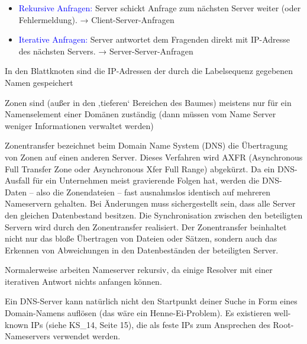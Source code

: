 \begin{itemize}
    \item \textcolor{blue}{Rekursive Anfragen:} Server schickt Anfrage zum nächsten Server weiter (oder Fehlermeldung).
    → Client-Server-Anfragen
    \item \textcolor{blue}{Iterative Anfragen:} Server antwortet dem Fragenden direkt mit IP-Adresse des nächsten Servers.
    → Server-Server-Anfragen
\end{itemize}

In den Blattknoten sind die IP-Adressen der durch die Labelsequenz gegebenen Namen gespeichert

Zonen sind (außer in den ‚tieferen‘ Bereichen des Baumes) meistens nur für ein Namenselement einer Domänen zuständig (dann müssen vom Name Server weniger Informationen verwaltet werden)

Zonentransfer bezeichnet beim Domain Name System (DNS) die Übertragung von Zonen auf einen anderen Server.
Dieses Verfahren wird AXFR (Asynchronous Full Transfer Zone oder Asynchronous Xfer Full Range) abgekürzt.
Da ein DNS-Ausfall für ein Unternehmen meist gravierende Folgen hat, werden die DNS-Daten – also die Zonendateien – fast ausnahmslos identisch auf mehreren Nameservern gehalten.
Bei Änderungen muss sichergestellt sein, dass alle Server den gleichen Datenbestand besitzen.
Die Synchronisation zwischen den beteiligten Servern wird durch den Zonentransfer realisiert.
Der Zonentransfer beinhaltet nicht nur das bloße Übertragen von Dateien oder Sätzen, sondern auch das Erkennen von Abweichungen in den Datenbeständen der beteiligten Server.


Normalerweise arbeiten Nameserver rekursiv, da einige Resolver mit einer iterativen Antwort nichts anfangen können.

Ein DNS-Server kann natürlich nicht den Startpunkt deiner Suche in Form eines Domain-Namens auflösen (das wäre ein Henne-Ei-Problem).
Es existieren well-known IPs (siehe KS\_14, Seite 15), die als feste IPs zum Ansprechen des Root-Nameservers verwendet werden.

